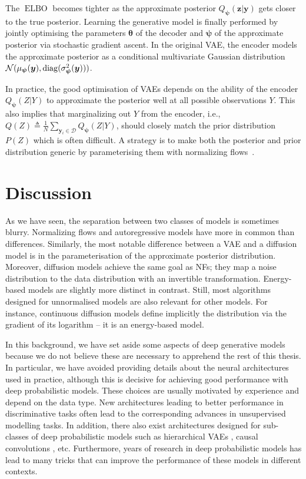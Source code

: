 The $\operatorname{ELBO}$ becomes tighter as the approximate posterior $Q_{\bm \psi}(\mathbf{z}|\mathbf{y})$ gets closer to the true posterior.
Learning the generative model is finally performed by jointly optimising the parameters $\mathbf{\theta}$ of the decoder and ${\bm \psi}$ of the approximate posterior via stochastic gradient ascent.
In the original VAE, the encoder models the approximate posterior as a conditional multivariate Gaussian distribution $\mathcal{N}(\mu_{\bm \psi}(\mathbf{y}), \diag(\sigma_{\bm\psi}^2(\mathbf{y})))$.

In practice, the good optimisation of VAEs depends on the ability of the encoder $Q_{\bm \psi}(Z|Y)$ to approximate the posterior well at all possible observations $Y$. This also implies that marginalizing out $Y$ from the encoder, i.e., $Q(Z) \triangleq \frac{1}{N}\sum_{\bm{y}_i \in \mathcal{D}} Q_{\bm \psi}(Z|Y)$, should closely match the prior distribution $P(Z)$ which is often difficult. A strategy is to make both the posterior and prior distribution generic by parameterising them with normalizing flows~\citep{berg2018sylvester}.

\section{Discussion}
As we have seen, the separation between two classes of models is sometimes blurry. Normalizing flows and autoregressive models have more in common than differences. Similarly, the most notable difference between a VAE and a diffusion model is in the parameterisation of the approximate posterior distribution. Moreover, diffusion models achieve the same goal as NFs; they map a noise distribution to the data distribution with an invertible transformation. Energy-based models are slightly more distinct in contrast. Still, most algorithms designed for unnormalised models are also relevant for other models. For instance, continuous diffusion models define implicitly the distribution via the gradient of its logarithm -- it is an energy-based model.

In this background, we have set aside some aspects of deep generative models because we do not believe these are necessary to apprehend the rest of this thesis. In particular, we have avoided providing details about the neural architectures used in practice, although this is decisive for achieving good performance with deep probabilistic models. These choices are usually motivated by experience and depend on the data type. New architectures leading to better performance in discriminative tasks often lead to the corresponding advances in unsupervised modelling tasks. In addition, there also exist architectures designed for sub-classes of deep probabilistic models such as hierarchical VAEs \citep{vahdat_nvae_2020}, causal convolutions \citep{van_den_oord_wavenet_2016}, etc. Furthermore, years of research in deep probabilistic models has lead to many tricks that can improve the performance of these models in different contexts.

